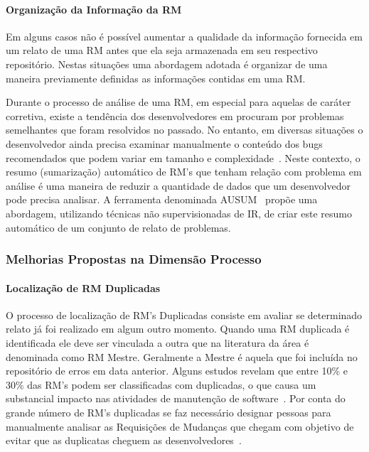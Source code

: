 \paragraph{Organização da Informação da RM}

	Em alguns casos não é possível aumentar a qualidade da informação fornecida em
um relato de uma RM antes que ela seja armazenada em seu respectivo repositório.
Nestas situações uma abordagem adotada é organizar de uma maneira previamente
definidas as informações contidas em uma RM\@.

Durante o processo de análise de uma RM, em especial para aquelas de caráter
corretiva, existe a tendência dos desenvolvedores em procuram por problemas
semelhantes que foram resolvidos no passado. No entanto, em diversas situações o
desenvolvedor ainda precisa examinar manualmente o conteúdo dos bugs
recomendados que podem variar em tamanho e complexidade~\cite{mani2012ausum}.
Neste contexto, o resumo (sumarização) automático de RM's que tenham relação com
problema em análise é uma maneira de reduzir a quantidade de dados que um
desenvolvedor pode precisa analisar. A ferramenta denominada
AUSUM~\cite{mani2012ausum} propõe uma abordagem, utilizando técnicas não
supervisionadas de IR, de criar este resumo automático de um conjunto de relato
de problemas.

\subsubsection{Melhorias Propostas na Dimensão Processo}
\label{ssub:melhorias_dim_processo}

\paragraph{Localização de RM Duplicadas}
O processo de localização de RM's Duplicadas consiste em avaliar se determinado
relato já foi realizado em algum outro momento. Quando uma RM duplicada é
identificada ele deve ser vinculada a outra que na literatura da área é
denominada como RM Mestre. Geralmente a Mestre é aquela que foi incluída no
repositório de erros em data anterior. Alguns estudos revelam que entre 10\% e
30\% das RM's podem ser classificadas com duplicadas, o que causa um substancial
impacto nas atividades de manutenção de
software~\cite{anvik2005coping,cavalcanti2013bug,Runeson:2007:DDD:1248820.1248882}.
Por conta do grande número de RM's duplicadas se faz necessário designar pessoas
para manualmente analisar as Requisições de Mudanças que chegam com objetivo de
evitar que as duplicatas cheguem as desenvolvedores~\cite{anvik2005coping}.

